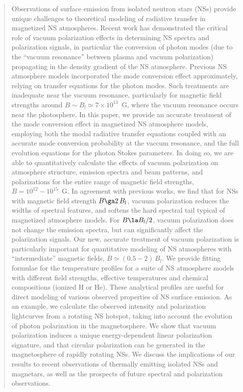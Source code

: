 \documentclass[useAMS,onecolumn,usenatbib,usegraphicx]{mn2e}
\begin{document}
\begin{abstract}
Observations of surface emission from isolated neutron stars (NSs)
provide unique challenges to theoretical modeling of radiative
transfer in magnetized NS atmospheres.  Recent work has demonstrated
the critical role of vacuum polarization effects in determining NS
spectra and polarization signals, in particular the conversion of
photon modes (due to the ``vacuum resonance'' between plasma and vacuum
polarization) propagating in the density gradient of the NS
atmosphere. Previous NS atmosphere models incorporated the mode 
conversion effect approximately, relying on transfer equations
for the photon modes. Such treatments are inadequate near the vacuum 
resonance, particularly for magnetic field strengths around
$B\sim B_l\simeq 7\times 10^{13}$~G, where the vacuum resonance
occurs near the photosphere.
In this paper, we provide an accurate treatment of the mode conversion
effect in magnetized NS atmosphere models, 
employing both the modal radiative transfer equations coupled with 
an accurate mode conversion probability at the vaccum resonance,
and the full evolution equations for the photon Stokes parameters. In doing
so, we are able to quantitatively calculate 
the effects of vacuum polarization on atmosphere structure, emission
spectra and beam patterns, and polarizations for the entire range 
of magnetic field strengths, $B=10^{12}-10^{15}$~G.  
In agreement with previous works, we find that 
for NSs with magnetic field strength $B\ga 2\,B_l$,
vacuum polarization reduces the widths of spectral features, 
and softens the hard spectral tail typical of magnetized atmosphere models.
For $B\la B_l/2$, vacuum polarization does not change the 
emission spectra, but can significantly affect the polarization signals.
Our new, accurate treatment of vacuum polarization 
is particularly important for quantitative 
modeling of NS atmospheres with ``intermediate'' magnetic fields,
$B\simeq (0.5-2)\,B_l$. We provide fitting formulae for the temperature
profiles for a suite of NS atmosphere models with different 
field strengths, effective temperatures and chemical 
compositions (ionized H or He). These analytical profiles are useful for 
direct modeling of various observed properties of NS surface emission.
As an example, we calculate the observed intensity and
polarization lightcurves from a 
rotating NS hotspot, taking into account the evolution of photon 
polarization in the magnetosphere. We show that vacuum polarization
induces a unique energy-dependent linear polarization signature,
and that circular polarization can be generated in the magnetosphere 
of rapidly rotating 
NSs. We discuss the implications of our results to recent 
observations of thermally emitting isolated NSs and magnetars,
as well as the prospects of future spectral and polarization observations.
\end{abstract}
\end{document}

